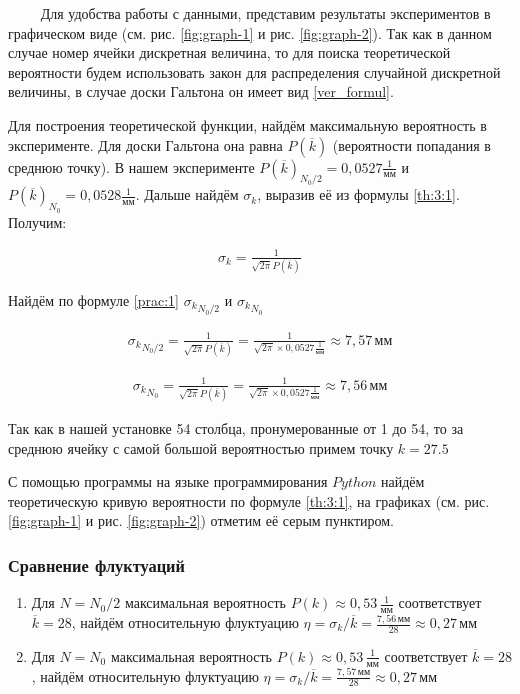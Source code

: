 $\qquad$ Для удобства работы с данными, представим результаты экспериментов в графическом виде (см. рис. \ref{fig:graph-1} и рис. \ref{fig:graph-2}). Так как в данном случае номер ячейки дискретная величина, то для поиска теоретической вероятности будем использовать закон для распределения случайной дискретной величины, в случае доски Гальтона он имеет вид \eqref{ver_formul}.

Для построения теоретической функции, найдём максимальную вероятность в эксперименте. Для доски Гальтона она равна $P(\overline{k})$ (вероятности попадания в среднюю точку). В нашем эксперименте $P(\overline{k})_{N_0/2} = 0,0527 \frac{1}{\text{мм}}$ и $P(\overline{k})_{N_0} = 0,0528 \frac{1}{\text{мм}}$. Дальше найдём $\sigma_k$, выразив её из формулы \eqref{th:3:1}. Получим:

\begin{align} \label{prac:1}
	\sigma_k = \frac{1}{\sqrt{2 \pi} P(\overline{k})} 
\end{align}

Найдём по формуле \eqref{prac:1} ${\sigma_k}_{N_0/2}$ и ${\sigma_k}_{N_0}$ 

\begin{align*}
	{\sigma_k}_{N_0/2} = \frac{1}{\sqrt{2 \pi} P(\overline{k})} = \frac{1}{\sqrt{2 \pi} \times 0,0527 \frac{1}{\text{мм}}} \approx 7,57 \, \text{мм}
\end{align*}

\begin{align*}
	{\sigma_k}_{N_0} = \frac{1}{\sqrt{2 \pi} P(\overline{k})} = \frac{1}{\sqrt{2 \pi} \times 0,0527 \frac{1}{\text{мм}}} \approx 7,56 \, \text{мм}
\end{align*}

Так как в нашей установке 54 столбца, пронумерованные от 1 до 54, то за среднюю ячейку с самой большой вероятностью примем точку $k = 27.5$ 

С помощью программы на языке программирования $Python$ найдём теоретическую кривую вероятности по формуле \eqref{th:3:1}, на графиках (см. рис. \ref{fig:graph-1} и рис. \ref{fig:graph-2}) отметим её серым пунктиром.

\subsubsection{Сравнение флуктуаций}

\begin{enumerate}
	\item 
	{
		Для $N = N_0 / 2$ максимальная вероятность $P(k) \approx 0,53 \, \frac{1}{\text{мм}}$ соответствует $\overline{k} = 28$, найдём относительную флуктуацию $\eta = {\sigma_k}/{\overline{k}} = \frac{7,56 \, \text{мм}}{28} \approx 0,27 \, \text{мм}$
	}
	\item 
	{
		Для $N = N_0$ максимальная вероятность $P(k) \approx 0,53 \, \frac{1}{\text{мм}}$ соответствует $\overline{k} = 28$, найдём относительную флуктуацию $\eta = {\sigma_k}/{\overline{k}} = \frac{7,57 \, \text{мм}}{28} \approx 0,27 \, \text{мм}$
	}
\end{enumerate}


